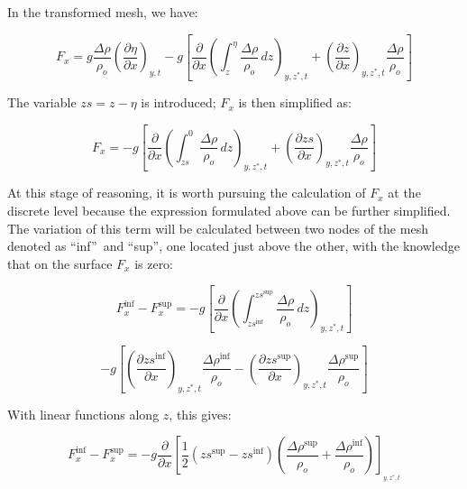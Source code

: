

In the transformed mesh, we have:%

\begin{equation}
F_{x}=g\frac{\Delta\rho}{\rho_{o}}\left(  \frac{\partial \eta}{\partial
x}\right)  _{y,t}-g\left[  \frac{\partial}{\partial x}\left(  \int%
\nolimits_{z}^{\eta}\frac{\Delta\rho}{\rho_{o}}\,dz\right)  _{y,z^{\ast}%
,t}+\left(  \frac{\partial z}{\partial x}\right)  _{y,z^{\ast},t}\frac
{\Delta\rho}{\rho_{o}}\right]
\end{equation}


The variable $zs=z-\eta$ is introduced; $F_{x}$ is then simplified as:%

\begin{equation}
F_{x}=-g\left[  \frac{\partial}{\partial x}\left(  \int\nolimits_{zs}^{0}%
\frac{\Delta\rho}{\rho_{o}}\,dz\right)  _{y,z^{\ast},t}+\left(  \frac{\partial
zs}{\partial x}\right)  _{y,z^{\ast},t}\frac{\Delta\rho}{\rho_{o}}\right]
\end{equation}


At this stage of reasoning, it is worth pursuing the calculation of $F_{x}$ at
the discrete level because the expression formulated above can be further
simplified. The variation of this term will be calculated between two nodes of
the mesh denoted as \textquotedblleft inf\textquotedblright\ and
\textquotedblleft sup\textquotedblright, one located just above the other,
with the knowledge that on the surface $F_{x}$ is zero:%

\[
F_{x}^{\inf}-F_{x}^{\sup}=-g\left[  \frac{\partial}{\partial x}\left(
\int\nolimits_{zs^{\inf}}^{zs^{\sup}}\frac{\Delta\rho}{\rho_{o}}\,dz\right)
_{y,z^{\ast},t}\right]
\]
%

\begin{equation}
-g\left[  \left(  \frac{\partial zs^{\inf}}{\partial x}\right)  _{y,z^{\ast
},t}\frac{\Delta\rho^{\inf}}{\rho_{o}}-\left(  \frac{\partial zs^{\sup}%
}{\partial x}\right)  _{y,z^{\ast},t}\frac{\Delta\rho^{\sup}}{\rho_{o}%
}\right]
\end{equation}


With linear functions along $z$, this gives:%

\[
F_{x}^{\inf}-F_{x}^{\sup}=-g\frac{\partial}{\partial x}\left[  \frac{1}%
{2}\left(  zs^{\sup}-zs^{\inf}\right)  \left(  \frac{\Delta\rho^{\sup}}%
{\rho_{o}}+\frac{\Delta\rho^{\inf}}{\rho_{o}}\right)  \right]  _{_{y,z^{\ast
},t}}%
\]
%

